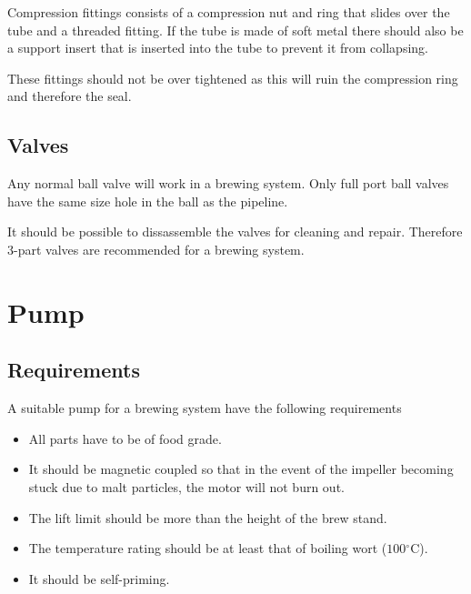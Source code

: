 \documentclass[11pt,fleqn]{book} %
\newcommand{\degree}{\ensuremath{^\circ}}
\begin{document}
Compression fittings consists of a compression nut and ring that slides over the tube and a threaded fitting. If the tube is made of soft metal there should also be a support insert that is inserted into the tube to prevent it from collapsing.

These fittings should not be over tightened as this will ruin the compression ring and therefore the seal.

\section{Valves}

Any normal ball valve will work in a brewing system. Only full port ball valves have the same size hole in the ball as the pipeline.

It should be possible to dissassemble the valves for cleaning and repair. Therefore 3-part valves are recommended for a brewing system.



\chapter{Pump}

\section{Requirements}

A suitable pump for a brewing system have the following requirements

\begin{itemize}
\item All parts have to be of food grade.
\item It should be magnetic coupled so that in the event of the impeller becoming stuck due to malt particles, the motor will not burn out.
\item The lift limit should be more than the height of the brew stand.
\item The temperature rating should be at least that of boiling wort ($100\degree$C).
\item It should be self-priming.
\end{itemize}
\end{document}
